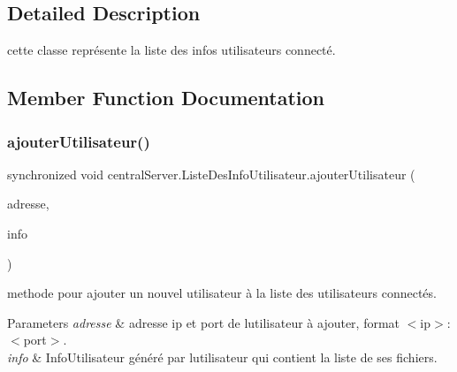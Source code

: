 \subsection{Detailed Description}
cette classe représente la liste des infos utilisateurs connecté. 

\subsection{Member Function Documentation}
\mbox{\label{classcentralServer_1_1ListeDesInfoUtilisateur_a310ca7eb2f644fbd22809983e69b77fd}} 
\subsubsection{\texorpdfstring{ajouter\+Utilisateur()}{ajouterUtilisateur()}}
{\footnotesize\ttfamily synchronized void central\+Server.\+Liste\+Des\+Info\+Utilisateur.\+ajouter\+Utilisateur (\begin{DoxyParamCaption}\item[{String}]{adresse,  }\item[{\hyperlink{classcommun_1_1InfoUtilisateur}{Info\+Utilisateur}}]{info }\end{DoxyParamCaption})\hspace{0.3cm}{\ttfamily [inline]}}



methode pour ajouter un nouvel utilisateur à la liste des utilisateurs connectés. 


\begin{DoxyParams}{Parameters}
{\em adresse} & adresse ip et port de l\textquotesingle{}utilisateur à ajouter, format $<$ip$>$\+:$<$port$>$. \\
\hline
{\em info} & Info\+Utilisateur généré par l\textquotesingle{}utilisateur qui contient la liste de ses fichiers. \\
\hline
\end{DoxyParams}
\mbox{\label{classcentralServer_1_1ListeDesInfoUtilisateur_a5d9e027bd438ac48b1dfda5e07d5f8fd}} 
